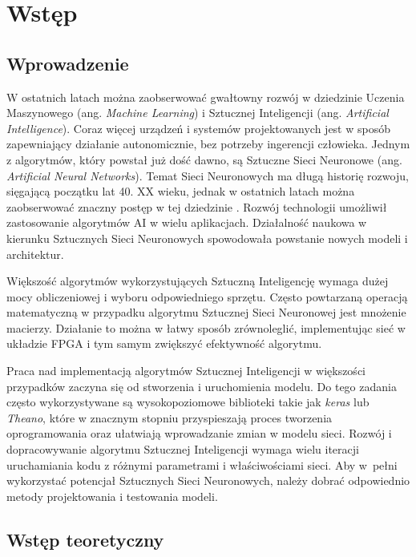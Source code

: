 \newpage %
\cleardoublepage %
\pagestyle{headings}
\section{Wstęp}

\subsection{Wprowadzenie}

W ostatnich latach można zaobserwować gwałtowny rozwój w dziedzinie 
Uczenia Maszynowego (ang. \emph{Machine Learning}) i Sztucznej Inteligencji 
(ang. \emph{Artificial Intelligence}). Coraz więcej urządzeń i systemów projektowanych jest w sposób zapewniający działanie autonomicznie, bez potrzeby ingerencji człowieka. 
Jednym z algorytmów, który powstał już dość dawno, są Sztuczne Sieci Neuronowe (ang. \emph{Artificial Neural Networks}). Temat Sieci Neuronowych ma długą historię rozwoju, sięgającą początku lat 40. XX wieku, jednak w ostatnich latach można zaobserwować znaczny postęp w tej dziedzinie \cite{Kriesel2007NeuralNetworks}. Rozwój technologii umożliwił zastosowanie algorytmów AI w wielu aplikacjach. Działalność naukowa w kierunku Sztucznych Sieci Neuronowych spowodowała powstanie nowych modeli i architektur.

Większość algorytmów wykorzystujących Sztuczną Inteligencję wymaga dużej mocy 
obliczeniowej i wyboru odpowiedniego sprzętu. Często powtarzaną operacją matematyczną 
w przypadku algorytmu Sztucznej Sieci Neuronowej jest mnożenie macierzy.
Działanie to można w łatwy sposób zrównoleglić, implementując sieć w układzie 
FPGA i tym samym zwiększyć efektywność algorytmu.

Praca nad implementacją algorytmów Sztucznej Inteligencji w większości 
przypadków zaczyna się od stworzenia i uruchomienia modelu. Do tego zadania 
często wykorzystywane są wysokopoziomowe biblioteki takie jak \emph{keras} lub \emph{Theano}, które w znacznym stopniu przyspieszają proces tworzenia oprogramowania oraz ułatwiają wprowadzanie zmian w modelu sieci. Rozwój i dopracowywanie 
algorytmu Sztucznej Inteligencji wymaga wielu iteracji uruchamiania kodu 
z różnymi parametrami i właściwościami sieci. Aby w~pełni wykorzystać potencjał Sztucznych Sieci Neuronowych, należy dobrać odpowiednio metody projektowania i testowania modeli.

\subsection{Wstęp teoretyczny}

